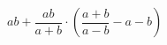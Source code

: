 \begin{ex}[type=expression]
	\begin{condition}
		\(ab+\dfrac{ab}{a+b}\cdot\left( \dfrac{a+b}{a-b} -a-b\right)\)
	\end{condition}
\end{ex}